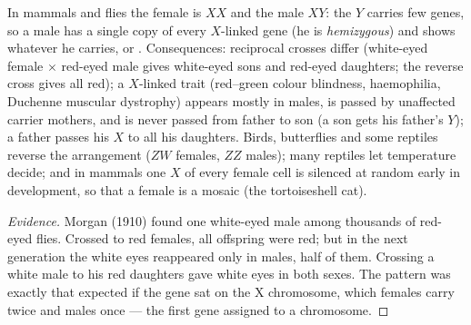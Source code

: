 \begin{proposition}\label{prop:b2:meiosis-heredity:sexlinked}
In mammals and flies the female is $XX$ and the male $XY$: the $Y$
carries few genes, so a male has a single copy of every $X$-linked
gene (he is \emph{hemizygous}) and shows whatever  he carries,
 or . Consequences: reciprocal crosses differ
(white-eyed female $\times$ red-eyed male gives white-eyed sons and
red-eyed daughters; the reverse cross gives all red); a 
$X$-linked trait (red--green colour blindness, haemophilia, Duchenne
muscular dystrophy) appears mostly in males, is passed by unaffected
carrier mothers, and is never passed from father to son (a son gets
his father's $Y$); a father passes his $X$ to all his daughters.
Birds, butterflies and some reptiles reverse the arrangement ($ZW$
females, $ZZ$ males); many reptiles let temperature decide; and in
mammals one $X$ of every female cell is silenced at random early in
development, so that a  female is a mosaic (the
tortoiseshell cat).
\end{proposition}
\begin{proof}[Evidence]
Morgan (1910) found one white-eyed male among thousands of
red-eyed flies. Crossed to red females, all offspring were red; but
in the next generation the white eyes reappeared only in males,
half of them. Crossing a white male to his red daughters gave white
eyes in both sexes. The pattern was exactly that expected if the
gene sat on the X chromosome, which females carry twice and males
once --- the first gene assigned to a chromosome.
\end{proof}

